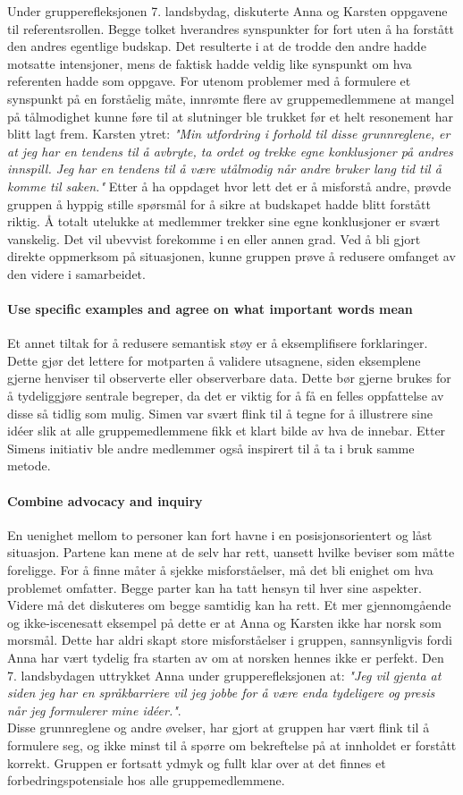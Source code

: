 Under grupperefleksjonen 7. landsbydag, diskuterte Anna og Karsten oppgavene til referentsrollen.
Begge tolket hverandres synspunkter for fort uten å ha forstått den andres egentlige budskap.
Det resulterte i at de trodde den andre hadde motsatte intensjoner, mens de faktisk hadde veldig like synspunkt om hva referenten hadde som oppgave. 
For utenom problemer med å formulere et synspunkt på en forståelig måte, innrømte flere av gruppemedlemmene at mangel på tålmodighet kunne føre til at slutninger ble trukket før et helt resonement har blitt lagt frem. 
Karsten ytret: \emph{"Min utfordring i forhold til disse grunnreglene, er at jeg har en tendens til å avbryte, ta ordet og trekke egne konklusjoner på andres innspill. Jeg har en tendens til å være utålmodig når andre bruker lang tid til å komme til saken."}
Etter å ha oppdaget hvor lett det er å misforstå andre, prøvde gruppen å hyppig stille spørsmål for å sikre at budskapet hadde blitt forstått riktig.
Å totalt utelukke at medlemmer trekker sine egne konklusjoner er svært vanskelig. Det vil ubevvist forekomme i en eller annen grad.
Ved å bli gjort direkte oppmerksom på situasjonen, kunne gruppen prøve å redusere omfanget av den videre i samarbeidet. \\

\paragraph{Use specific examples and agree on what important words mean} Et annet tiltak for å redusere semantisk støy er å eksemplifisere forklaringer.
Dette gjør det lettere for motparten å validere utsagnene, siden eksemplene gjerne henviser til observerte eller observerbare data.
Dette bør gjerne brukes for å tydeliggjøre sentrale begreper, da det er viktig for å få en felles oppfattelse av disse så tidlig som mulig.
Simen var svært flink til å tegne for å illustrere sine idéer slik at alle gruppemedlemmene fikk et klart bilde av hva de innebar. Etter Simens initiativ ble andre medlemmer også inspirert til å ta i bruk samme metode. \\

\paragraph{Combine advocacy and inquiry} En uenighet mellom to personer kan fort havne i en posisjonsorientert og låst situasjon.
Partene kan mene at de selv har rett, uansett hvilke beviser som måtte foreligge.
For å finne måter å sjekke misforståelser, må det bli enighet om hva problemet omfatter. Begge parter kan ha tatt hensyn til hver sine aspekter.
Videre må det diskuteres om begge samtidig kan ha rett.
Et mer gjennomgående og ikke-iscenesatt eksempel på dette er at Anna og Karsten ikke har norsk som morsmål.
Dette har aldri skapt store misforståelser i gruppen, sannsynligvis fordi Anna har vært tydelig fra starten av om at norsken hennes ikke er perfekt.
Den 7. landsbydagen uttrykket Anna under grupperefleksjonen at: \emph{"Jeg vil gjenta at siden jeg har en språkbarriere vil jeg jobbe for å være enda tydeligere og presis når jeg formulerer mine idéer."}. \\

Disse grunnreglene og andre øvelser, har gjort at gruppen har vært flink til å formulere seg, og ikke minst til å spørre om bekreftelse på at innholdet er forstått korrekt.
Gruppen er fortsatt ydmyk og fullt klar over at det finnes et forbedringspotensiale hos alle gruppemedlemmene.
